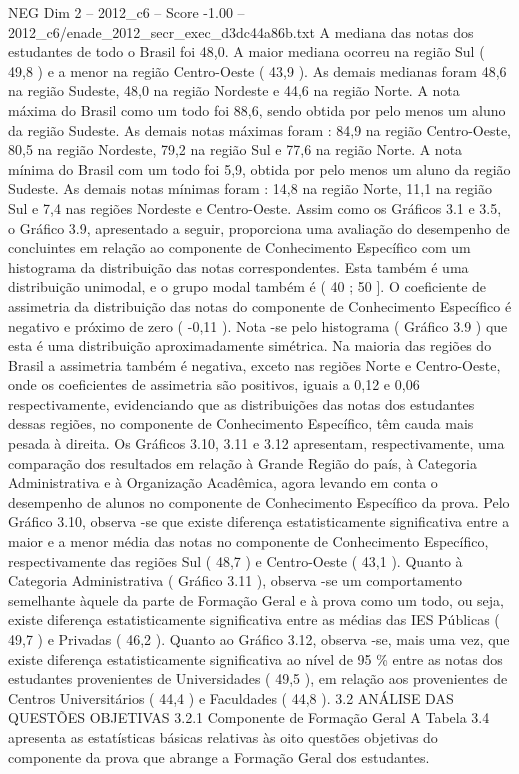 \begin{textsample}{NEG Dim 2 – 2012\_c6 – Score -1.00 – 2012\_c6/enade\_2012\_secr\_exec\_d3dc44a86b.txt}
A mediana das notas dos estudantes de todo o Brasil foi 48,0.
A maior mediana ocorreu na região Sul ( 49,8 ) e a menor na região Centro-Oeste ( 43,9 ).
As demais medianas foram 48,6 na região Sudeste, 48,0 na região Nordeste e 44,6 na região Norte.
A nota máxima do Brasil como um todo foi 88,6, sendo obtida por pelo menos um aluno da região Sudeste.
As demais notas máximas foram : 84,9 na região Centro-Oeste, 80,5 na região Nordeste, 79,2 na região Sul e 77,6 na região Norte.
A nota mínima do Brasil com um todo foi 5,9, obtida por pelo menos um aluno da região Sudeste.
As demais notas mínimas foram : 14,8 na região Norte, 11,1 na região Sul e 7,4 nas regiões Nordeste e Centro-Oeste.
Assim como os Gráficos 3.1 e 3.5, o Gráfico 3.9, apresentado a seguir, proporciona uma avaliação do desempenho de concluintes em relação ao componente de Conhecimento Específico com um histograma da distribuição das notas correspondentes.
Esta também é uma distribuição unimodal, e o grupo modal também é ( 40 ; 50 ].
O coeficiente de assimetria da distribuição das notas do componente de Conhecimento Específico é negativo e próximo de zero ( -0,11 ).
Nota -se pelo histograma ( Gráfico 3.9 ) que esta é uma distribuição aproximadamente simétrica.
Na maioria das regiões do Brasil a assimetria também é negativa, exceto nas regiões Norte e Centro-Oeste, onde os coeficientes de assimetria são positivos, iguais a 0,12 e 0,06 respectivamente, evidenciando que as distribuições das notas dos estudantes dessas regiões, no componente de Conhecimento Específico, têm cauda mais pesada à direita.
Os Gráficos 3.10, 3.11 e 3.12 apresentam, respectivamente, uma comparação dos resultados em relação à Grande Região do país, à Categoria Administrativa e à Organização Acadêmica, agora levando em conta o desempenho de alunos no componente de Conhecimento Específico da prova.
Pelo Gráfico 3.10, observa -se que existe diferença estatisticamente significativa entre a maior e a menor média das notas no componente de Conhecimento Específico, respectivamente das regiões Sul ( 48,7 ) e Centro-Oeste ( 43,1 ).
Quanto à Categoria Administrativa ( Gráfico 3.11 ), observa -se um comportamento semelhante àquele da parte de Formação Geral e à prova como um todo, ou seja, existe diferença estatisticamente significativa entre as médias das IES Públicas ( 49,7 ) e Privadas ( 46,2 ).
Quanto ao Gráfico 3.12, observa -se, mais uma vez, que existe diferença estatisticamente significativa ao nível de 95 \% entre as notas dos estudantes provenientes de Universidades ( 49,5 ), em relação aos provenientes de Centros Universitários ( 44,4 ) e Faculdades ( 44,8 ). 3.2 ANÁLISE DAS QUESTÕES OBJETIVAS 3.2.1 Componente de Formação Geral A Tabela 3.4 apresenta as estatísticas básicas relativas às oito questões objetivas do componente da prova que abrange a Formação Geral dos estudantes.

\end{textsample}

